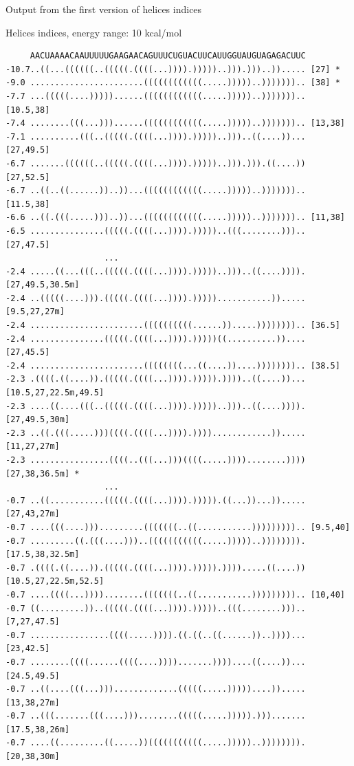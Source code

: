 \documentclass[ignorenonframetext,10pt]{beamer}
\begin{document}
\begin{frame}[fragile]
  Output from the first version of helices indices
  \begin{block}{\tiny Helices indices, energy range: 10 kcal/mol}
  \tiny
  \begin{verbatim}
     AACUAAAACAAUUUUUGAAGAACAGUUUCUGUACUUCAUUGGUAUGUAGAGACUUC
-10.7..((...((((((..(((((.((((...)))).)))))..))).)))..))..... [27] *
-9.0 .......................((((((((((((.....)))))..))))))).. [38] *
-7.7 ...(((((....)))))......((((((((((((.....)))))..))))))).. [10.5,38]
-7.4 ........(((...)))......((((((((((((.....)))))..))))))).. [13,38]
-7.1 ..........(((..(((((.((((...)))).)))))..)))..((....))... [27,49.5]
-6.7 .......((((((..(((((.((((...)))).)))))..))).))).((....)) [27,52.5]
-6.7 ..((..((......))..))...((((((((((((.....)))))..))))))).. [11.5,38]
-6.6 ..((.(((.....)))..))...((((((((((((.....)))))..))))))).. [11,38]
-6.5 ...............(((((.((((...)))).)))))..(((........))).. [27,47.5]
                    ...
-2.4 .....((...(((..(((((.((((...)))).)))))..)))..((....)))). [27,49.5,30.5m]
-2.4 ..(((((....))).(((((.((((...)))).)))))...........))..... [9.5,27,27m]
-2.4 .......................((((((((((......)).....)))))))).. [36.5]
-2.4 ...............(((((.((((...)))).)))))((..........)).... [27,45.5]
-2.4 .......................((((((((...((....))....)))))))).. [38.5]
-2.3 .((((.((....)).(((((.((((...)))).))))).))))..((....))... [10.5,27,22.5m,49.5]
-2.3 ....((....(((..(((((.((((...)))).)))))..)))..((....)))). [27,49.5,30m]
-2.3 ..((.(((.....)))((((.((((...)))).))))............))..... [11,27,27m]
-2.3 ................((((..(((...)))((((.....))))........)))) [27,38,36.5m] *
                    ...
-0.7 ..((...........(((((.((((...)))).))))).((...))...))..... [27,43,27m]
-0.7 ....(((....))).........(((((((..((...........))))))))).. [9.5,40]
-0.7 .........((.(((....)))..(((((((((((.....)))))..)))))))). [17.5,38,32.5m]
-0.7 .((((.((....)).(((((.((((...)))).))))).)))).....((....)) [10.5,27,22.5m,52.5]
-0.7 ....((((...))))........(((((((..((...........))))))))).. [10,40]
-0.7 ((.........))..(((((.((((...)))).)))))..(((........))).. [7,27,47.5]
-0.7 ................((((.....)))).((.((..((......))..))))... [23,42.5]
-0.7 ........((((......((((....)))).......))))....((....))... [24.5,49.5]
-0.7 ..((....(((...))).............(((((.....)))))....))..... [13,38,27m]
-0.7 ..(((.......(((....)))........(((((.....))))).)))....... [17.5,38,26m]
-0.7 ....((.........((.....))(((((((((((.....)))))..)))))))). [20,38,30m]                    
  \end{verbatim} 
  \end{block}
\end{frame}
\end{document}
